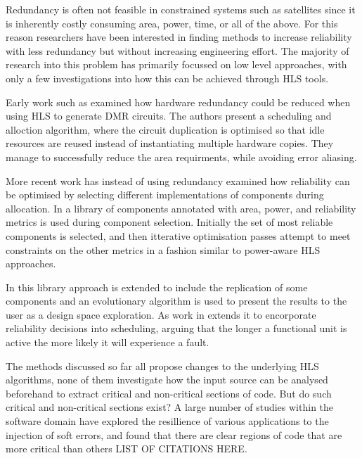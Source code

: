 Redundancy is often not feasible in constrained systems such as satellites
since it is inherently costly consuming area, power, time, or all of the above.
For this reason researchers have been interested in finding methods to
increase reliability with less redundancy but without increasing engineering effort.
The majority of research into this problem has primarily focussed on low level approaches,
with only a few investigations into how this can be achieved through HLS tools.

Early work such as \cite{antola1998high} examined how hardware redundancy 
could be reduced when using HLS to generate DMR circuits.
The authors present a scheduling and alloction algorithm, where the circuit duplication is optimised
so that idle resources are reused instead of instantiating multiple hardware copies.
They manage to successfully reduce the area requirments, while avoiding error aliasing.

More recent work has instead of using redundancy examined how reliability can be optimised by 
selecting different implementations of components during allocation.
In \cite{tosun2005reliability}
a library of components annotated with area, power, and reliability metrics is used during component selection.    
Initially the set of most reliable components is selected, and then itterative optimisation passes attempt to
meet constraints on the other metrics in a fashion similar to power-aware HLS approaches. 

In \cite{glass2007interactive} this library approach is extended to include the replication of some components 
and an evolutionary algorithm is used to present the results to the user as a design space exploration.
As work in \cite{hara2013cost} extends it to encorporate reliability decisions into scheduling, arguing that
the longer a functional unit is active the more likely it will experience a fault. 

The methods discussed so far all propose changes to the underlying HLS algorithms,
none of them  investigate how the input source can be analysed beforehand to extract
critical and non-critical sections of code.
But do such critical and non-critical sections exist?
A large number of studies within the software domain have explored the resillience of various applications
to the injection of soft errors, and found that there are clear regions of code that
are more critical than others LIST OF CITATIONS HERE.

